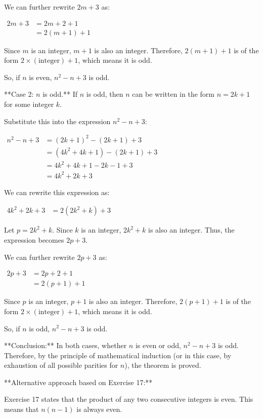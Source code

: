 \documentclass{article}
\begin{document}
We can further rewrite $2m + 3$ as:

$\begin{align*} 2m + 3 &= 2m + 2 + 1 \\ &= 2(m + 1) + 1 \end{align*}$

Since $m$ is an integer, $m+1$ is also an integer. Therefore, $2(m+1) + 1$ is of the form $2 \times (\text{integer}) + 1$, which means it is odd.

So, if $n$ is even, $n^2 - n + 3$ is odd.

**Case 2: $n$ is odd.**
If $n$ is odd, then $n$ can be written in the form $n = 2k + 1$ for some integer $k$.

Substitute this into the expression $n^2 - n + 3$:

$\begin{align*} n^2 - n + 3 &= (2k + 1)^2 - (2k + 1) + 3 \\ &= (4k^2 + 4k + 1) - (2k + 1) + 3 \\ &= 4k^2 + 4k + 1 - 2k - 1 + 3 \\ &= 4k^2 + 2k + 3 \end{align*}$

We can rewrite this expression as:

$\begin{align*} 4k^2 + 2k + 3 &= 2(2k^2 + k) + 3 \end{align*}$

Let $p = 2k^2 + k$. Since $k$ is an integer, $2k^2 + k$ is also an integer. Thus, the expression becomes $2p + 3$.

We can further rewrite $2p + 3$ as:

$\begin{align*} 2p + 3 &= 2p + 2 + 1 \\ &= 2(p + 1) + 1 \end{align*}$

Since $p$ is an integer, $p+1$ is also an integer. Therefore, $2(p+1) + 1$ is of the form $2 \times (\text{integer}) + 1$, which means it is odd.

So, if $n$ is odd, $n^2 - n + 3$ is odd.

**Conclusion:**
In both cases, whether $n$ is even or odd, $n^2 - n + 3$ is odd. Therefore, by the principle of mathematical induction (or in this case, by exhaustion of all possible parities for $n$), the theorem is proved.

**Alternative approach based on Exercise 17:**

Exercise 17 states that the product of any two consecutive integers is even. This means that $n(n-1)$ is always even.
\end{document}

